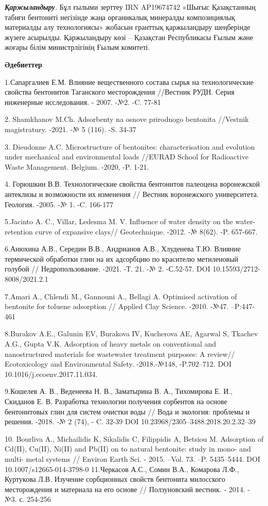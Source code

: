 \emph{{\bfseries Қаржыландыру}.} Бұл ғылыми зерттеу IRN AP19674742 «Шығыс
Қазақстанның табиғи бентониті негізінде жаңа органикалық минералды
композициялық материалды алу технологиясы» жобасын гранттық қаржыландыру
шеңберінде жүзеге асырылды. Қаржыландыру көзі -- Қазақстан Республикасы
Ғылым және жоғары білім министрлігінің Ғылым комитеті.

\begin{center}
{\bfseries Әдебиеттер}
\end{center}

\begin{noparindent}
1.Сапаргалиев Е.М. Влияние вещественного состава сырья на
технологические свойства бентонитов Таганского месторождения //Вестник
РУДН. Серия инженерные исследования. - 2007. -№2. -C. 77-81

2. Shamkhanov M.Ch. Adsorbenty na osnove prirodnogo bentonita //Vestnik
magistratury. -2021. -№ 5 (116). -S. 34-37

3. Dieudonne A.C. Microstructure of bentonites: characterisation and
evolution under mechanical and environmental loads //EURAD School for
Radioactive Waste Management. Belgium. -2020, -P. 1-21.

4. Горюшкин В.В. Технологические свойства бентонитов палеоцена
воронежской антеклизы и возможности их изменения // Вестник воронежского
университета. Геология. -2005. -№ 1. -C. 166-177

5.Jacinto A. C., Villar, Ledesma M. V. Influence of water density on the
water-retention curve of expansive clays// Geotechnique. -2012. -№
8(62). -P. 657-667.

6.Анюхина А.В., Середин В.В., Андрианов А.В., Хлуденева Т.Ю. Влияние
термической обработки глин на их адсорбцию по красителю метиленовый
голубой // Недропользование. -2021. -Т. 21. -№ 2. -С.52-57. DOI
10.15593/2712-8008/2021.2.1

7.Amari A., Chlendi M., Gannouni A., Bellagi A. Optimised activation of
bentonite for toluene adsorption // Applied Clay Science. -2010. -№47.
--P:447-461

8.Burakov A.E., Galunin EV, Burakova IV, Kucherova AE, Agarwal S,
Tkachev A.G., Gupta V.K. Adsorption of heavy metals on conventional and
nanostructured materials for wastewater treatment purposes: A review//
Ecotoxicology and Environmental Safety. -2018.-№148, -P.702--712. DOI
10.1016/j.ecoenv.2017.11.034.

9.Кошелев А. В., Веденеева Н. В., Заматырина В. А., Тихомирова Е. И.,
Скиданов Е. В. Разработка технологии получения сорбентов на основе
бентонитовых глин для систем очистки воды // Вода и экология: проблемы и
решения. -2018. -№ 2 (74), - C. 32-39 DOI
10.23968/2305--3488.2018.20.2.32--39

10. Bourliva A., Michailidis K, Sikalidis C, Filippidis A, Betsiou M.
Adsorption of Cd(II), Cu(II), Ni(II) and Pb(II) on to natural bentonite:
study in mono- and multi- metal systems // Environ Earth Sci. - 2015.
--Vol. 73. --P. 5435--5444. DOI 10.1007/s12665-014-3798-0 11.Черкасов
А.С., Сомин В.А., Комарова Л.Ф., Куртукова Л.В. Изучение сорбционных
свойств бентонита милосского месторождения и материала на его основе //
Ползуновский вестник. - 2014. - №3. с. 254-256
\end{noparindent}

